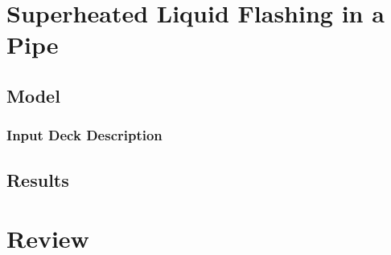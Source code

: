 \section{Superheated Liquid Flashing in a Pipe}
\label{sect:flashing_numerical_experiment}
\subsection{Model}
\label{subsect:flashing_model}
\subsubsection{Input Deck Description}
\label{subsect:flashing_input_deck}
\subsection{Results}
\label{subsect:flashing_results}


\section{Review}
\label{sect:scaling_review}
